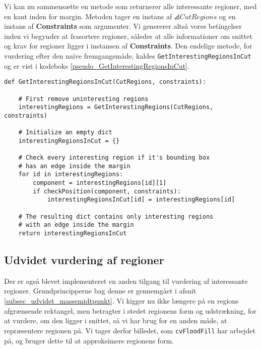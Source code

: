{Vi kan nu sammensætte en metode som returnerer alle interessante
regioner, med en kant inden for margin. Metoden tager en instans af
$\angles{CutRegions}$ og en instans af \textbf{Constraints} som
argumenter. Vi genererer altså vores betingelser inden vi begynder at
frasortere regioner, således at alle informationer om snittet og krav
for regioner ligger i instansen af \textbf{Constraints}. Den endelige
metode, for vurdering efter den naive fremgangsmåde, kaldes
\texttt{GetInterestingRegionsInCut} og er vist i kodeboks
\ref{pseudo_GetInterestingRegionsInCut}.

\begin{lstlisting}[caption={Pseudokode, som returnerer alle interessante
    regioner, der har en kant, af deres afgrænsende rektangel, inden for
    margin.},
    captionpos=b, label={pseudo_GetInterestingRegionsInCut}, frame=tb, breaklines=false,
    float=hb]
def GetInterestingRegionsInCut(CutRegions, constraints):

    # First remove uninteresting regions
    interestingRegions = GetInterestingRegions(CutRegions, constraints)

    # Initialize an empty dict
    interestingRegionsInCut = {}

    # Check every interesting region if it's bounding box
    # has an edge inside the margin
    for id in interestingRegions:
        component = interestingRegions[id][1]
        if checkPosition(component, constraints):
            interestingRegionsInCut[id] = interestingRegions[id]

    # The resulting dict contains only interesting regions
    # with an edge inside the margin
    return interestingRegionsInCut
\end{lstlisting}

\subsection{Udvidet vurdering af regioner}
Der er også blevet implementeret en anden tilgang til vurdering af
interessante regioner. Grundprincipperne bag denne er gennemgået i
afsnit \ref{subsec_udvidet_massemidtpunkt}. Vi kigger nu ikke længere på
en regions afgrænsende rektangel, men betragter i stedet regionens form
og udstrækning, for at vurdere, om den ligger i snittet, så vi har brug
for en anden måde, at repræsentere regionen på. Vi tager derfor
billedet, som \texttt{cvFloodFill} har arbejdet på, og bruger dette til
at approksimere regionens form.

}
